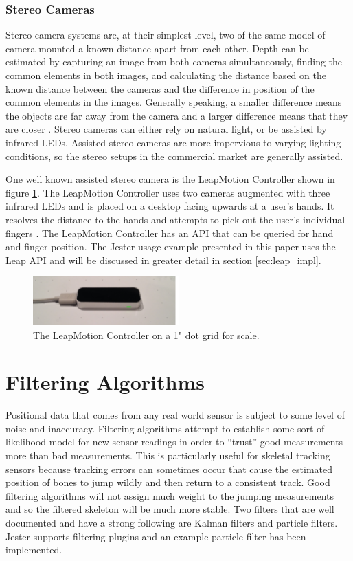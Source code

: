 \subsubsection{Stereo Cameras}

Stereo camera systems are, at their simplest level, two of the same model of camera mounted a known distance apart from each other. Depth can be estimated by capturing an image from both cameras simultaneously, finding the common elements in both images, and calculating the distance based on the known distance between the cameras and the difference in position of the common elements in the images. Generally speaking, a smaller difference means the objects are far away from the camera and a larger difference means that they are closer \cite{lucas1981iterative}. Stereo cameras can either rely on natural light, or be assisted by infrared LEDs. Assisted stereo cameras are more impervious to varying lighting conditions, so the stereo setups in the commercial market are generally assisted.

One well known assisted stereo camera is the LeapMotion Controller shown in figure \ref{fig:leap}. The LeapMotion Controller uses two cameras augmented with three infrared LEDs and is placed on a desktop facing upwards at a user’s hands. It resolves the distance to the hands and attempts to pick out the user’s individual fingers \cite{weichert2013analysis}. The LeapMotion Controller has an API that can be queried for hand and finger position. The Jester usage example presented in this paper uses the Leap API and will be discussed in greater detail in section \ref{sec:leap_impl}.

\begin{figure}[]
\centering
\includegraphics[width=0.5\textwidth]{figures/leap}
\caption{The LeapMotion Controller on a 1" dot grid for scale.}
\label{fig:leap}
\end{figure}

\section{Filtering Algorithms}\label{sec:filter_back}

Positional data that comes from any real world sensor is subject to some level of noise and inaccuracy. Filtering algorithms attempt to establish some sort of likelihood model for new sensor readings in order to “trust” good measurements more than bad measurements. This is particularly useful for skeletal tracking sensors because tracking errors can sometimes occur that cause the estimated position of bones to jump wildly and then return to a consistent track. Good filtering algorithms will not assign much weight to the jumping measurements and so the filtered skeleton will be much more stable. Two filters that are well documented and have a strong following are Kalman filters and particle filters. Jester supports filtering plugins and an example particle filter has been implemented.

